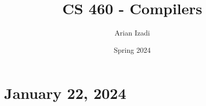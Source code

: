 \documentclass[twocolumn]{article}
\title{CS 460 {-} Compilers}
\author{Arian Izadi}
\date{Spring 2024}
\begin{document}
\maketitle

\section*{January 22, 2024}
\end{document}
